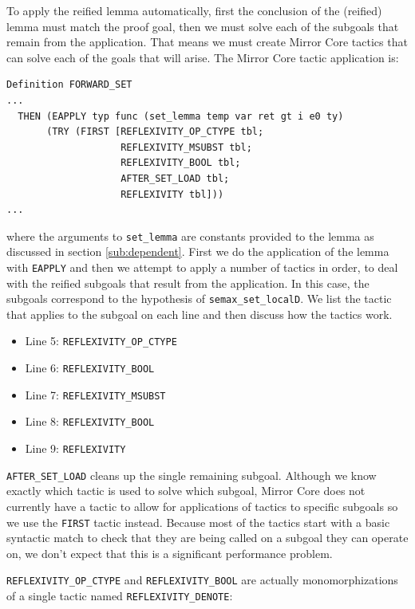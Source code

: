 \documentclass{puthesis}
\begin{document}
To apply the reified lemma automatically, first the conclusion of the
(reified) lemma must match the proof goal, then we must solve each of
the subgoals that remain from the application. That means we must
create Mirror Core tactics that can solve each of the goals that will
arise. The Mirror Core tactic application is:

\begin{lstlisting}
Definition FORWARD_SET 
...
  THEN (EAPPLY typ func (set_lemma temp var ret gt i e0 ty)
       (TRY (FIRST [REFLEXIVITY_OP_CTYPE tbl;
                    REFLEXIVITY_MSUBST tbl; 
                    REFLEXIVITY_BOOL tbl;
                    AFTER_SET_LOAD tbl;
                    REFLEXIVITY tbl]))
...
\end{lstlisting}

where the arguments to \lstinline|set_lemma| are constants provided to
the lemma as discussed in section \ref{sub:dependent}.  First we do
the application of the lemma with \lstinline|EAPPLY| and then we
attempt to apply a number of tactics in order, to deal with the
reified subgoals that result from the application. In this case, the
subgoals correspond to the hypothesis of
\lstinline|semax_set_localD|. We list the tactic that applies to the
subgoal on each line and then discuss how the tactics work.

\begin{itemize}
\item Line 5: \lstinline|REFLEXIVITY_OP_CTYPE|
\item Line 6: \lstinline|REFLEXIVITY_BOOL|
\item Line 7: \lstinline|REFLEXIVITY_MSUBST|
\item Line 8: \lstinline|REFLEXIVITY_BOOL|
\item Line 9: \lstinline|REFLEXIVITY|
\end{itemize}

\lstinline|AFTER_SET_LOAD| cleans up the single remaining subgoal.
Although we know exactly which tactic is used to solve which subgoal,
Mirror Core does not currently have a tactic to allow for applications
of tactics to specific subgoals so we use the \lstinline|FIRST| tactic
instead. Because most of the tactics start with a basic syntactic
match to check that they are being called on a subgoal they can
operate on, we don't expect that this is a significant performance
problem.

\lstinline|REFLEXIVITY_OP_CTYPE| and \lstinline|REFLEXIVITY_BOOL| are
actually monomorphizations of a single tactic named
\lstinline|REFLEXIVITY_DENOTE|:
\end{document}

